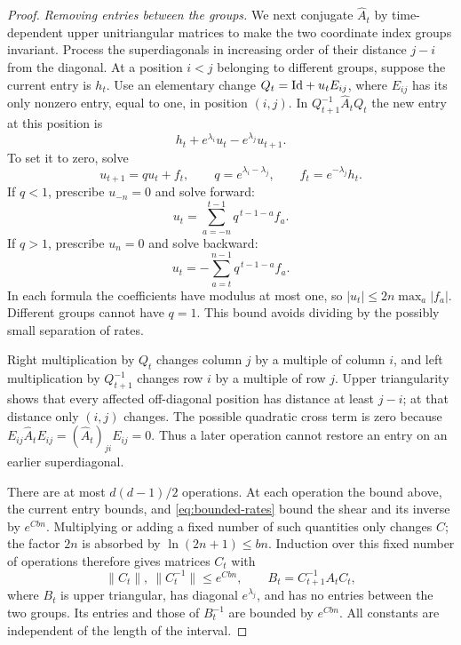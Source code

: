 \begin{proof}
\emph{Removing entries between the groups.}
We next conjugate $\widehat A_t$ by time-dependent upper
unitriangular matrices to make the two coordinate index groups
invariant.  Process the superdiagonals in increasing order of their
distance $j-i$ from the diagonal.
At a position $i<j$ belonging to different groups, suppose the
current entry is $h_t$.  Use an elementary change
$Q_t=\mathrm{Id}+u_tE_{ij}$, where $E_{ij}$ has its only nonzero entry,
equal to one, in position $(i,j)$.
In $Q_{t+1}^{-1}\widehat A_tQ_t$ the new entry at this position is
\[
 h_t+e^{\lambda_i}u_t-e^{\lambda_j}u_{t+1}.
\]
To set it to zero, solve
\begin{equation}\label{eq:shear-recurrence}
 u_{t+1}=q u_t+f_t,\qquad
 q=e^{\lambda_i-\lambda_j},\qquad f_t=e^{-\lambda_j}h_t.
\end{equation}
If $q<1$, prescribe $u_{-n}=0$ and solve forward:
\[
 u_t=\sum_{a=-n}^{t-1}q^{\,t-1-a}f_a.
\]
If $q>1$, prescribe $u_n=0$ and solve backward:
\[
 u_t=-\sum_{a=t}^{n-1}q^{\,t-1-a}f_a.
\]
In each formula the coefficients have modulus at most one, so
$|u_t|\leq2n\max_a|f_a|$.
Different groups cannot have $q=1$.
This bound avoids dividing by the possibly small separation of rates.

Right multiplication by $Q_t$ changes column $j$ by a multiple of
column $i$, and left multiplication by $Q_{t+1}^{-1}$ changes row
$i$ by a multiple of row $j$.
Upper triangularity shows that every affected off-diagonal position
has distance at least $j-i$; at that distance only $(i,j)$ changes.
The possible quadratic cross term is zero because
$E_{ij}\widehat A_tE_{ij}=(\widehat A_t)_{ji}E_{ij}=0$.
Thus a later operation cannot restore an entry on an earlier
superdiagonal.

There are at most $d(d-1)/2$ operations.
At each operation the bound above, the current entry bounds, and
\eqref{eq:bounded-rates} bound the shear and its inverse by
$e^{Cbn}$.  Multiplying or adding a fixed number of such quantities
only changes $C$; the factor $2n$ is absorbed by $\ln(2n+1)\leq bn$.
Induction over this fixed number of operations therefore gives
matrices $C_t$ with
\begin{equation}\label{eq:finite-gauge}
 \|C_t\|,\ \|C_t^{-1}\|\leq e^{Cbn},
 \qquad
 B_t=C_{t+1}^{-1}A_tC_t,
\end{equation}
where $B_t$ is upper triangular, has diagonal $e^{\lambda_j}$,
and has no entries between the two groups.  Its entries and those of
$B_t^{-1}$ are bounded by $e^{Cbn}$.
All constants are independent of the length of the interval.


\end{proof}
